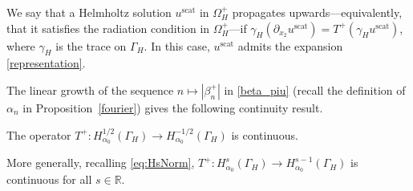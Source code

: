 \documentclass[a4paper,10pt]{article}
\newcommand{\IR}{{\mathbb R}}
\newcommand{\scat}{{\mathrm{scat}}}
\newcommand{\dxt}{{\partial_{x_2}}}
\newcommand{\GH}{{\Gamma_H}}
\begin{document}
We say that a Helmholtz solution $u^\scat$ in $\Omega_H^+$ propagates upwards---equivalently, that it satisfies the radiation condition in $\Omega_H^+$---if 
$\gamma_H(\dxt u^\scat)=T^+(\gamma_H u^\scat)$, where $\gamma_H$ is the trace on $\GH$. 
In this case, $u^\scat$ admits the expansion \eqref{representation}.

The linear growth of the sequence $n\mapsto|\beta_n^+|$ in \eqref{beta_piu} (recall the definition of $\alpha_n$ in Proposition~\ref{fourier}) gives the following continuity result.
\begin{lem}
The operator $T^+:H^{1/2}_{\alpha_0}(\GH) \to H^{-1/2}_{\alpha_0}(\GH)$ is continuous.
\end{lem}
More generally, recalling \eqref{eq:HsNorm}, $T^+:H^s_{\alpha_0}(\GH) \to H^{s-1}_{\alpha_0}(\GH)$ is continuous for all $s\in\IR$.
\end{document}
